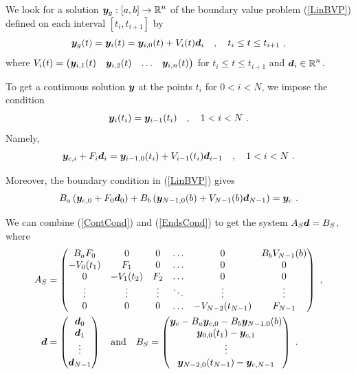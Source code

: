 We look for a solution $\displaystyle \bm{y}_g:[a,b]\to \mathbb{R}^n$ of the boundary
value problem (\ref{LinBVP}) defined on each interval $[t_i,t_{i+1}]$ by
\[
\bm{y}_g(t) = \bm{y}_i(t) = \bm{y}_{i,0}(t) + V_i(t) \bm{d}_i
\quad , \quad t_i \leq t \leq t_{i+1} \ ,
\]
where $\displaystyle V_i(t) =
\begin{pmatrix}
\bm{y}_{i,1}(t) & \bm{y}_{i,2}(t) & \ldots & \bm{y}_{i,n}(t)  
\end{pmatrix}$ for $t_i \leq t \leq t_{i+1}$ and
$\displaystyle \bm{d}_i \in \mathbb{R}^n$.

To get a continuous solution $\bm{y}$ at the points $t_i$ for
$0 < i < N$, we impose the condition
\[
\bm{y}_i(t_i) = \bm{y}_{i-1}(t_i) \quad , \quad 1 < i < N \ .
\]
Namely,
\begin{equation} \label{ContCond}
\bm{y}_{c,i} + F_i\bm{d}_i = \bm{y}_{i-1,0}(t_i) +
V_{i-1}(t_i)\bm{d}_{i-1} \quad , \quad 1 < i < N \ .
\end{equation}

Moreover, the boundary condition in (\ref{LinBVP}) gives
\begin{equation} \label{EndsCond}
B_a \left( \VEC{y}_{c,0} + F_0\VEC{d}_0 \right) + B_b \left(
\VEC{y}_{N-1,0}(b) + V_{N-1}(b)\VEC{d}_{N-1} \right) = \VEC{y}_c \ .
\end{equation}

We can combine (\ref{ContCond}) and (\ref{EndsCond}) to get the system
$A_S \bm{d} = B_S$, where
\begin{align}
A_S &= \begin{pmatrix}
B_a F_0 & 0 & 0 & \ldots & 0 & B_b V_{N-1}(b)\\
-V_0(t_1) & F_1 & 0 & \ldots & 0 & 0 \\
0 & -V_1(t_2) & F_2 & \ldots & 0 & 0 \\
\vdots & \vdots & \vdots & \ddots & \vdots & \vdots \\
0 & 0 & 0 & \ldots & -V_{N-2}(t_{N-1}) & F_{N-1}
\end{pmatrix}
\ ,  \label{MFPSBVPa} \\
\bm{d} &= \begin{pmatrix} \bm{d}_0 \\ \bm{d}_1 \\ \vdots \\
\bm{d}_{N-1} \end{pmatrix}
\quad \text{and} \quad
B_S = \begin{pmatrix}
\bm{y}_c - B_a \bm{y}_{c,0} -B_b\bm{y}_{N-1.0}(b) \\
\bm{y}_{0,0}(t_1) - \bm{y}_{c,1} \\
\vdots \\
\bm{y}_{N-2,0}(t_{N-1}) - \bm{y}_{c,N-1}
\end{pmatrix} \ . \label{MFPSBVPb}
\end{align}

